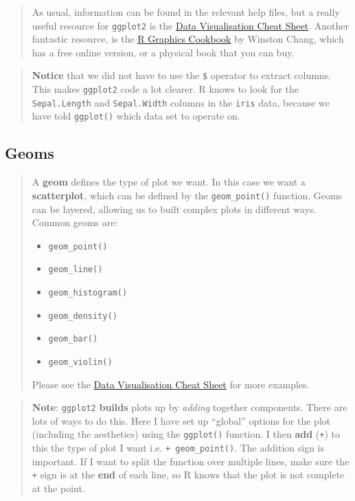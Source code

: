 \documentclass[]{book}
\providecommand{\tightlist}{%
  \setlength{\itemsep}{0pt}\setlength{\parskip}{0pt}}
\theoremstyle{definition}
\theoremstyle{definition}
\theoremstyle{definition}
\theoremstyle{remark}
\begin{document}
\begin{quote}
As usual, information can be found in the relevant help files, but a
really useful resource for \texttt{ggplot2} is the
\href{https://github.com/rstudio/cheatsheets/raw/master/data-visualization-2.1.pdf}{Data
Visualisation Cheat Sheet}. Another fantastic resource, is the
\href{http://www.cookbook-r.com/Graphs/}{R Graphics Cookbook} by Winston
Chang, which has a free online version, or a physical book that you can
buy.
\end{quote}

\begin{quote}
\textbf{Notice} that we did not have to use the \texttt{\$} operator to
extract columns. This makes \texttt{ggplot2} code a lot clearer. R knows
to look for the \texttt{Sepal.Length} and \texttt{Sepal.Width} columns
in the \texttt{iris} data, because we have told \texttt{ggplot()} which
data set to operate on.
\end{quote}

\subsection{Geoms}\label{geoms}

\begin{quote}
A \textbf{geom} defines the type of plot we want. In this case we want a
\textbf{scatterplot}, which can be defined by the \texttt{geom\_point()}
function. Geoms can be layered, allowing us to built complex plots in
different ways. Common geoms are:

\begin{itemize}
\tightlist
\item
  \texttt{geom\_point()}
\item
  \texttt{geom\_line()}
\item
  \texttt{geom\_histogram()}
\item
  \texttt{geom\_density()}
\item
  \texttt{geom\_bar()}
\item
  \texttt{geom\_violin()}
\end{itemize}

Please see the
\href{https://github.com/rstudio/cheatsheets/raw/master/data-visualization-2.1.pdf}{Data
Visualisation Cheat Sheet} for more examples.
\end{quote}

\begin{quote}
\textbf{Note}: \texttt{ggplot2} \textbf{builds} plots up by
\emph{adding} together components. There are lots of ways to do this.
Here I have set up ``global'' options for the plot (including the
aesthetics) using the \texttt{ggplot()} function. I then \textbf{add}
(\texttt{+}) to this the type of plot I want i.e.
\texttt{+\ geom\_point()}. The addition sign is important. If I want to
split the function over multiple lines, make sure the \texttt{+} sign is
at the \textbf{end} of each line, so R knows that the plot is not
complete at the point.
\end{quote}
\end{document}
